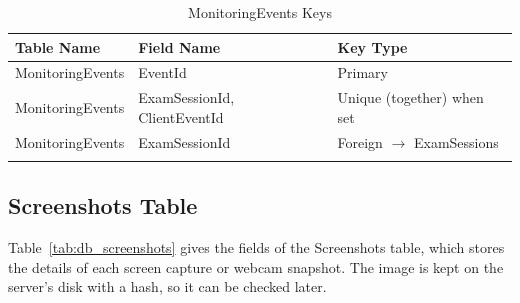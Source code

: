 {\small
\begin{longtable}{>{\raggedright\arraybackslash}p{4.0cm}>{\raggedright\arraybackslash}p{4.6cm}>{\raggedright\arraybackslash}p{4.6cm}}
\caption{MonitoringEvents Keys}\label{tab:keys_monitoringevents}\\
\hline\hline
\textbf{Table Name} & \textbf{Field Name} & \textbf{Key Type} \\ \hline
\endfirsthead
\hline\hline
\endlastfoot
MonitoringEvents & EventId & Primary \\*
MonitoringEvents & ExamSessionId, ClientEventId & Unique (together) when set \\*
MonitoringEvents & ExamSessionId & Foreign $\rightarrow$ ExamSessions \\*
\end{longtable}
}

\par\ifdim\dimexpr\pagegoal-\pagetotal\relax<376pt\newpage\fi
\subsection{Screenshots Table}
Table~\ref{tab:db_screenshots} gives the fields of the Screenshots table, which stores the details of each screen capture or webcam snapshot. The image is kept on the server's disk with a hash, so it can be checked later.

